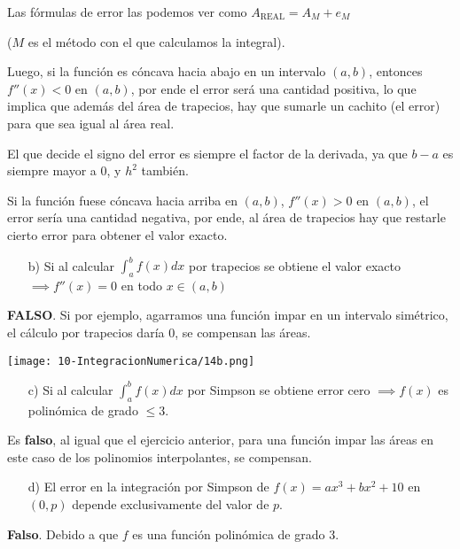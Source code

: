 \documentclass[11pt]{article}
\begin{document}
		Las fórmulas de error las podemos ver como $A_{\text{REAL}}=A_M+e_M$
		
		($M$ es el método con el que calculamos la integral).
		
		Luego, si la función es cóncava hacia abajo en un intervalo $(a,b)$, entonces $f''(x)<0$ en $(a,b)$, por ende el error será una cantidad positiva, lo que implica que además del área de trapecios, hay que sumarle un cachito (el error) para que sea igual al área real.
		
		El que decide el signo del error es siempre el factor de la derivada, ya que $b-a$ es siempre mayor a 0, y $h^2$ también.
		
		Si la función fuese cóncava hacia arriba en $(a,b)$, $f''(x)>0$ en $(a,b)$, el error sería una cantidad negativa, por ende, al área de trapecios hay que restarle cierto error para obtener el valor exacto.\\

	\begin{itemize}
		\item[b)] Si al calcular $\displaystyle \int_{a}^{b}f(x)dx$ por trapecios se obtiene el valor exacto $\implies f''(x)=0$ en todo $x \in (a,b)$
	\end{itemize}

	\textbf{FALSO}. Si por ejemplo, agarramos una función impar en un intervalo simétrico, el cálculo por trapecios daría 0, se compensan las áreas.
	
	\texttt{[image: 10-IntegracionNumerica/14b.png]}\\
	
	\begin{itemize}
		\item[c)] Si al calcular $\displaystyle \int_{a}^{b} f(x)dx$ por Simpson se obtiene error cero $\implies f(x)$ es polinómica de grado $\le 3$. 
	\end{itemize}

	Es \textbf{falso}, al igual que el ejercicio anterior, para una función impar las áreas en este caso de los polinomios interpolantes, se compensan.
		
	\begin{itemize}
		\item[d)] El error en la integración por Simpson de $f(x)=ax^3+bx^2+10$ en $(0,p)$ depende exclusivamente del valor de $p$.
	\end{itemize}

	\textbf{Falso}. Debido a que $f$ es una función polinómica de grado 3.
	
\end{document}
